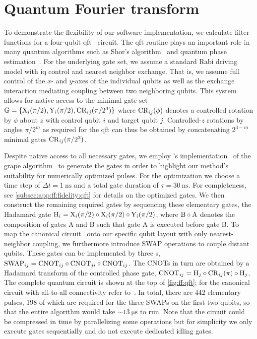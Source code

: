 \section{Quantum Fourier transform}\label{sec:ff:examples:qft}
To demonstrate the flexibility of our software implementation, we calculate filter functions for a four-qubit \acrfull{qft}~\cite{Coppersmith1994,Nielsen2011} circuit.
The \gls{qft} routine plays an important role in many quantum algorithms such as Shor's algorithm~\cite{Shor1997} and quantum phase estimation~\cite{Nielsen2011}.
For the underlying gate set, we assume a standard Rabi driving model with \acrshort{iq} control and nearest neighbor exchange.
That is, we assume full control of the $x$- and $y$-axes of the individual qubits as well as the exchange interaction mediating coupling between two neighboring qubits.
This system allows for native access to the minimal gate set $\mathbb{G} = \lbrace\mathrm{X}_{i}(\pi/2),\mathrm{Y}_{i}(\pi/2),\mathrm{CR}_{ij}(\pi/2^3)\rbrace$ where $\mathrm{CR}_{ij}(\phi)$ denotes a controlled rotation by $\phi$ about $z$ with control qubit $i$ and target qubit $j$.
Controlled-$z$ rotations by angles $\pi/2^m$ as required for the \gls{qft} can thus be obtained by concatenating $2^{3-m}$ minimal gates $\mathrm{CR}_{ij}(\pi/2^3)$.

Despite native access to all necessary gates, we employ \qutip's implementation~\cite{Johansson2012} of the \acrshort{grape} algorithm~\cite{Khaneja2005,Schulte-Herbruggen2005} to generate the gates in order to highlight our method's suitability for numerically optimized pulses.
For the optimization we choose a time step of $\Delta t = \qty{1}{\nano\second}$ and a total gate duration of $\tau = \qty{30}{\nano\second}$.
For completeness, see \cref{subsec:app:ff:fidelity:qft} for details on the optimized gates.
We then construct the remaining required gates by sequencing these elementary gates, \ie the Hadamard gate $\mathrm{H}_i = \mathrm{X}_{i}(\pi/2)\circ\mathrm{X}_{i}(\pi/2)\circ\mathrm{Y}_{i}(\pi/2)$, where $\mathrm{B}\circ\mathrm{A}$ denotes the composition of gates A and B such that gate A is executed before gate B\@.
To map the canonical circuit~\cite{Nielsen2011} onto our specific qubit layout with only nearest-neighbor coupling, we furthermore introduce SWAP operations to couple distant qubits.
These gates can be implemented by three s, $\mathrm{SWAP}_{ij} = \mathrm{CNOT}_{ij}\circ\mathrm{CNOT}_{ji}\circ\mathrm{CNOT}_{ij}$.
The CNOTs in turn are obtained by a Hadamard transform of the controlled phase gate, $\mathrm{CNOT}_{ij} = \mathrm{H}_j\circ\mathrm{CR}_{ij}(\pi)\circ\mathrm{H}_j$.
The complete quantum circuit is shown at the top of \cref{fig:ff:qft}; for the canonical circuit with all-to-all connectivity refer to~.
In total, there are \num{442} elementary pulses, \num{198} of which are required for the three SWAPs on the first two qubits, so that the entire algorithm would take $\sim\qty{13}{\micro\second}$ to run.
Note that the circuit could be compressed in time by parallelizing some operations but for simplicity we only execute gates sequentially and do not execute dedicated idling gates.

